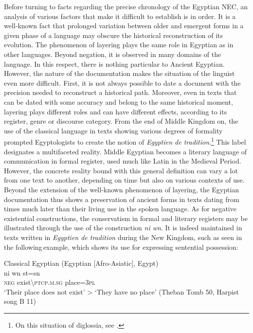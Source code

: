 \documentclass[output=paper,draft,draftmode,colorlinks,citecolor=brown]{langscibook}
\begin{document}
Before turning to facts regarding the precise chronology of the Egyptian NEC, an analysis of various factors that make it difficult to establish is in order. It is a well-known fact that prolonged variation between older and emergent forms in a given phase of a language may obscure the historical reconstruction of its evolution. The phenomenon of layering plays the same role in Egyptian as in other languages. Beyond negation, it is observed in many domains of the language. In this respect, there is nothing particular to Ancient Egyptian. However, the nature of the documentation makes the situation of the linguist even more difficult. First, it is not always possible to date a document with the precision needed to reconstruct a historical path. Moreover, even in texts that can be dated with some accuracy and belong to the same historical moment, layering plays different roles and can have different effects, according to its register, genre or discourse category. From the end of Middle Kingdom on, the use of the classical language in texts showing various degrees of formality prompted Egyptologists to create the notion of \emph{Egyptien de tradition}.\footnote{On this situation of diglossia, see \citet{Vernus1996}.} 
This label designates a multifaceted reality. Middle Egyptian becomes a literary language of communication in formal register, used much like Latin in the Medieval Period. However, the concrete reality bound with this general definition can vary a lot from one text to another, depending on time but also on various contexts of use. Beyond the extension of the well-known phenomenon of layering, the Egyptian documentation thus shows a preservation of ancient forms in texts dating from times much later than their living use in the spoken language. As for negative existential constructions, the conservatism in formal and literary registers may be illustrated through the use of the construction \textit{ni wn}. It is indeed maintained in texts written in \emph{Egyptien de tradition} during the New Kingdom, such as seen in the following example, which shows its use for expressing sentential possession:  

\ea Classical Egyptian (Egyptian [Afro-Asiatic], Egypt) \label{ex:AE46}\\
    \gll ni wn st=sn \\
    \textsc{neg} exist\textbackslash\textsc{ptcp.m.sg} place=\textsc{3pl}\\
    \glt ‘Their place does not exist’ > ‘They have no place’ (Theban Tomb 50, Harpist song B 11) 
\z 
 
\end{document}
